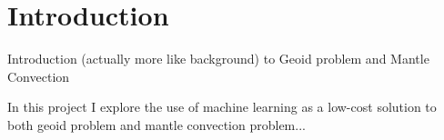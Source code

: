 \chapter{Introduction}

Introduction (actually more like background) to Geoid problem and Mantle Convection

In this project I explore the use of machine learning as a low-cost solution to both geoid problem and mantle convection problem...


